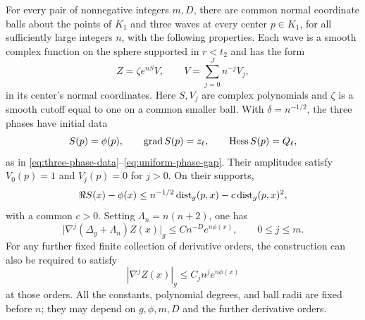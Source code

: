 \begin{lemma}
\label{lem:finite-waves}
For every pair of nonnegative integers $m,D$, there are common normal
coordinate balls about the points of $K_1$ and three waves at every
center $p\in K_1$, for all sufficiently large integers $n$, with the
following properties.  Each wave is a smooth complex function on the
sphere supported in $r<t_2$ and has the form
\begin{equation}
 Z=\zeta e^{nS}V,
 \qquad V=\sum_{j=0}^J n^{-j}V_j,
 \label{eq:finite-wave-form}
\end{equation}
in its center's normal coordinates.  Here $S,V_j$ are complex
polynomials and $\zeta$ is a smooth cutoff equal to one on a common
smaller ball.  With $\delta=n^{-1/2}$, the three phases have initial
data
\[
 S(p)=\phi(p),\qquad \operatorname{grad} S(p)=z_\ell,
 \qquad \operatorname{Hess} S(p)=Q_\ell,
\]
as in \eqref{eq:three-phase-data}--\eqref{eq:uniform-phase-gap}.
Their amplitudes satisfy $V_0(p)=1$ and $V_j(p)=0$ for $j>0$.
On their supports,
\begin{equation}
 \Re S(x)-\phi(x)
 \le n^{-1/2}\operatorname{dist}_g(p,x)-c\operatorname{dist}_g(p,x)^2,
 \label{eq:wave-localization}
\end{equation}
with a common $c>0$.  Setting $\Lambda_n=n(n+2)$, one has
\begin{equation}
 \bigl|\nabla^j(\Delta_g+\Lambda_n)Z(x)\bigr|_g
       \le Cn^{-D}e^{n\phi(x)},\qquad 0\le j\le m.
 \label{eq:wave-individual-residual}
\end{equation}
For any further fixed finite collection of derivative orders, the
construction can also be required to satisfy
\begin{equation}
 |\nabla^jZ(x)|_g\le C_j n^j e^{n\phi(x)}
 \label{eq:wave-individual-derivatives}
\end{equation}
at those orders.  All the constants, polynomial degrees, and ball
radii are fixed before $n$; they may depend on $g,\phi,m,D$ and the
further derivative orders.
\end{lemma}

